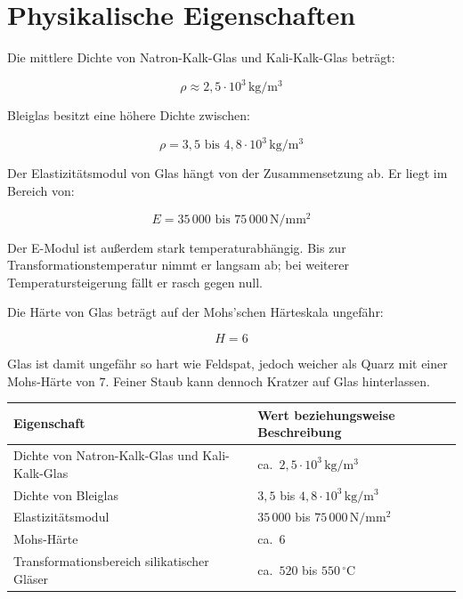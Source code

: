 \documentclass[
  12pt,
  a4paper,
  oneside
]{scrreprt}
\begin{document}
\section{Physikalische Eigenschaften}

Die mittlere Dichte von Natron-Kalk-Glas und Kali-Kalk-Glas beträgt:

\begin{equation}
  \rho \approx 2{,}5 \cdot 10^3\,\mathrm{kg/m^3}
\end{equation}

Bleiglas besitzt eine höhere Dichte zwischen:

\begin{equation}
  \rho =
  3{,}5 \text{ bis } 4{,}8 \cdot 10^3\,\mathrm{kg/m^3}
\end{equation}



Der Elastizitätsmodul von Glas hängt von der Zusammensetzung ab. Er
liegt im Bereich von:

\begin{equation}
  E =
  35\,000 \text{ bis } 75\,000\,\mathrm{N/mm^2}
\end{equation}

Der E-Modul ist außerdem stark temperaturabhängig. Bis zur
Transformationstemperatur nimmt er langsam ab; bei weiterer
Temperatursteigerung fällt er rasch gegen null. 

Die Härte von Glas beträgt auf der Mohs'schen Härteskala ungefähr:

\begin{equation}
  H = 6
\end{equation}

Glas ist damit ungefähr so hart wie Feldspat, jedoch weicher als Quarz
mit einer Mohs-Härte von $7$. Feiner Staub kann dennoch Kratzer auf
Glas hinterlassen. 

\begin{longtable}{
  >{\raggedright\arraybackslash}p{}
  >{\raggedright\arraybackslash}p{}
}
\toprule
\textbf{Eigenschaft} &
\textbf{Wert beziehungsweise Beschreibung} \\
\midrule
\endhead

Dichte von Natron-Kalk-Glas und Kali-Kalk-Glas &
ca.\ $2{,}5 \cdot 10^3\,\mathrm{kg/m^3}$ \\

Dichte von Bleiglas &
$3{,}5$ bis $4{,}8 \cdot 10^3\,\mathrm{kg/m^3}$ \\

Elastizitätsmodul &
$35\,000$ bis $75\,000\,\mathrm{N/mm^2}$ \\

Mohs-Härte &
ca.\ $6$ \\

Transformationsbereich silikatischer Gläser &
ca.\ $520$ bis $550\,^\circ\mathrm{C}$ \\

\bottomrule
\end{longtable}
\end{document}
